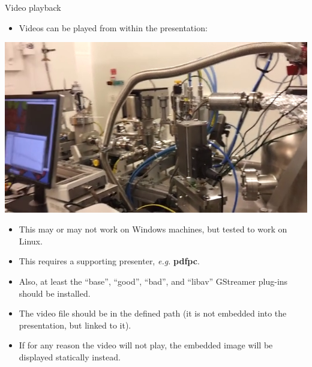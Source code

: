 \documentclass[usenames,dvipsnames]{beamer}
\begin{document}
\begin{frame}[t]{Video playback}

\begin{itemize}
  \item Videos can be played from within the presentation:
\end{itemize}
\begin{center}
  \href{run:ID16A.mp4?autostart&loop}{\includegraphics[height=0.23\textheight]{ID16A_snap}}
\end{center}
\begin{itemize}
  \item This may or may not work on Windows machines, but tested to work on Linux.
  \item This requires a supporting presenter, \emph{e.g.} \textbf{pdfpc}.
  \item Also, at least the ``base'', ``good'', ``bad'', and ``libav'' GStreamer plug-ins should be installed.
  \item The video file should be in the defined path (it is not embedded into the presentation, but linked to it).
  \item If for any reason the video will not play, the embedded image will be displayed statically instead.
\end{itemize}

\end{frame}

\end{document}
